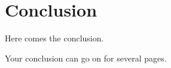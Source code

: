 
\chapter{Conclusion}
Here comes the conclusion.

\newpage
Your conclusion can go on for several pages.
